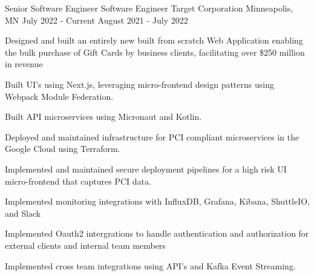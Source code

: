 

\begin{cventries}

  \cventrytarget
    {Senior Software Engineer} %
    {Software Engineer} %
    {Target Corporation}
    {Minneapolis, MN} %
    {July 2022 - Current} %
    {August 2021 - July 2022} %
    {
      \begin{cvitems} %
        \item {Designed and built an entirely new built from scratch Web Application enabling the bulk purchase of Gift Cards by business clients, facilitating over \$250 million in revenue}
        \item {Built UI's using Next.js, leveraging micro-frontend design patterns using Webpack Module Federation.}
        \item {Built API microservices using Micronaut and Kotlin.}
        \item {Deployed and maintained infrastructure for PCI compliant microservices in the Google Cloud using Terraform.}
        \item {Implemented and maintained secure deployment pipelines for a high risk UI micro-frontend that captures PCI data.}
        \item {Implemented monitoring integrations with InfluxDB, Grafana, Kibana, ShuttleIO, and Slack}
        \item {Implemented Oauth2 intergrations to handle authentication and authorization for external clients and internal team members}
        \item {Implemented cross team integrations using API's and Kafka Event Streaming.}
      \end{cvitems}
    }


\end{cventries}
